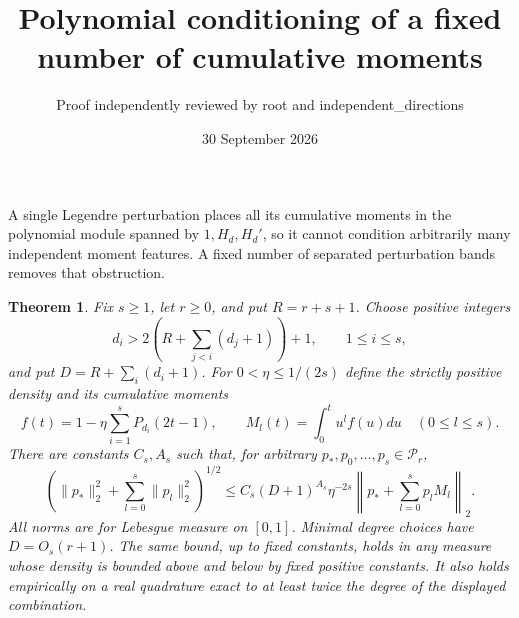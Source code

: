 \documentclass[11pt]{article}
\title{Polynomial conditioning of a fixed number of cumulative moments}
\author{Proof independently reviewed by root and independent\_directions}
\date{30 September 2026}
\newtheorem{theorem}{Theorem}
\newcommand{\PP}{\mathcal P}
\begin{document}
\maketitle
A single Legendre perturbation places all its cumulative moments in
the polynomial module spanned by $1,H_d,H_d'$, so it cannot condition
arbitrarily many independent moment features. A fixed number of
separated perturbation bands removes that obstruction.

\begin{theorem}\label{main}
Fix $s\ge1$, let $r\ge0$, and put $R=r+s+1$. Choose positive integers
\[
 d_i>2\left(R+\sum_{j<i}(d_j+1)\right)+1,
 \qquad 1\le i\le s,
\]
and put $D=R+\sum_i(d_i+1)$. For $0<\eta\le1/(2s)$ define the
strictly positive density and its cumulative moments
\[
 f(t)=1-\eta\sum_{i=1}^sP_{d_i}(2t-1),\qquad
 M_l(t)=\int_0^t u^l f(u)du\quad(0\le l\le s).
\]
There are constants $C_s,A_s$ such that, for arbitrary
$p_*,p_0,\ldots,p_s\in\PP_r$,
\[
 \left(\|p_*\|_2^2+\sum_{l=0}^s\|p_l\|_2^2\right)^{1/2}
 \le C_s(D+1)^{A_s}\eta^{-2s}
       \left\|p_*+\sum_{l=0}^sp_lM_l\right\|_2.
\]
All norms are for Lebesgue measure on $[0,1]$. Minimal degree choices
have $D=O_s(r+1)$. The same bound, up to fixed constants, holds in
any measure whose density is bounded above and below by fixed positive
constants. It also holds empirically on a real quadrature exact to
at least twice the degree of the displayed combination.
\end{theorem}
\end{document}
